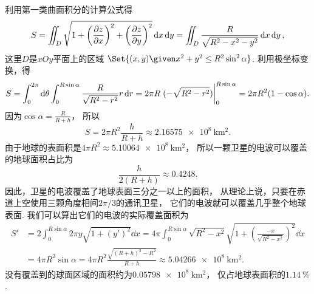 \begin{example}
\[\]
利用第一类曲面积分的计算公式得\[
	S = \iint_D \sqrt{1+\left(\pdv{z}{x}\right)^2+\left(\pdv{z}{y}\right)^2} \dd{x}\dd{y}
	= \iint_D \frac{R}{\sqrt{R^2-x^2-y^2}} \dd{x}\dd{y},
\]
这里\(D\)是\(xOy\)平面上的区域
\(\Set{ (x,y) \given x^2+y^2 \leq R^2\sin^2\alpha }\).
利用极坐标变换，得\[
	S = \int_0^{2\pi} \dd\theta
	\int_0^{R\sin\alpha} \frac{R}{\sqrt{R^2-r^2}} r\dd{r}
	= 2\pi R \eval{(-\sqrt{R^2-r^2})}_0^{R\sin\alpha}
	= 2\pi R^2(1-\cos\alpha).
\]
因为\(\cos\alpha=\frac{R}{R+h}\)，
所以\[
	S = 2\pi R^2\frac{h}{R+h}
	\approx \qty{2.16575e8}{\kilo\meter\squared}.
\]
由于地球的表面积是\(4\pi R^2 \approx \qty{5.10064e8}{\kilo\meter\squared}\)，
所以一颗卫星的电波可以覆盖的地球面积占比为\[
	\frac{h}{2(R+h)}
	\approx \num{0.4248}.
\]
因此，卫星的电波覆盖了地球表面三分之一以上的面积，
从理论上说，只要在赤道上空使用三颗角度相间\(2\pi/3\)的通讯卫星，
它们的电波就可以覆盖几乎整个地球表面.
我们可以算出它们的电波的实际覆盖面积为\begin{align*}
	S' &= 2\int_0^{R\sin\alpha} 2\pi y \sqrt{1+(y')^2} \dd{x}
	= 4\pi \int_0^{R\sin\alpha} \sqrt{R^2-x^2} \sqrt{1+\left(\frac{-x}{\sqrt{R^2-x^2}}\right)^2} \dd{x} \\
	&= 4\pi R^2\sin\alpha
	= 4\pi R^2 \frac{\sqrt{(R+h)^2-R^2}}{R+h}
	\approx \qty{5.04266e8}{\kilo\meter\squared}.
\end{align*}
没有覆盖到的球面区域的面积约为\(\qty{0.05798e8}{\kilo\meter\squared}\)，
仅占地球表面积的\(\qty{1.14}{\percent}\).
\end{example}
